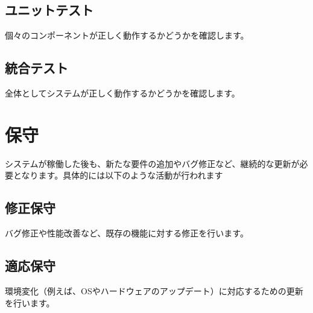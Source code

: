 \section{ユニットテスト}
個々のコンポーネントが正しく動作するかどうかを確認します。




\section{統合テスト}
全体としてシステムが正しく動作するかどうかを確認します。



\chapter{保守}
システムが稼働した後も、新たな要件の追加やバグ修正など、継続的な更新が必要となります。具体的には以下のような活動が行われます




\section{修正保守}
バグ修正や性能改善など、既存の機能に対する修正を行います。




\section{適応保守}
環境変化（例えば、OSやハードウェアのアップデート）に対応するための更新を行います。




